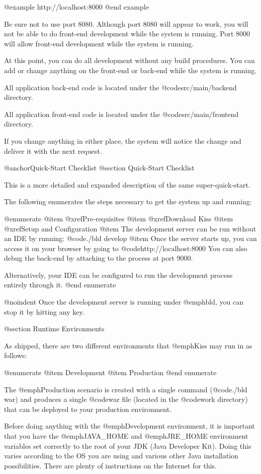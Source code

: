 @example
    http://localhost:8000
@end example

Be sure not to use port 8080.  Although port 8080 will appear to work,
you will not be able to do front-end development while the system is
running.  Port 8000 will allow front-end development while the system
is running.

At this point, you can do all development without any build
procedures.  You can add or change anything on the front-end or
back-end while the system is running.

All application back-end code is located under the @code{src/main/backend}
directory.

All application front-end code is located under the @code{src/main/frontend}
directory.

If you change anything in either place, the system will notice the change 
and deliver it with the next request.


@anchor{Quick-Start Checklist}
@section Quick-Start Checklist

This is a more detailed and expanded description of the same
super-quick-start.

The following enumerates the steps necessary to get the system up and running:

@enumerate
@item
@xref{Pre-requisites}
@item
@xref{Download Kiss}
@item
@xref{Setup and Configuration}
@item
The development server can be run without an IDE by running: @code{./bld develop}
@item
Once the server starts up, you can access it on your browser by going to 
@code{http://localhost:8000}  You can also debug the back-end by
attaching to the process at port 9000.

Alternatively, your IDE can be configured to run the development
process entirely through it.
@end enumerate

@noindent Once the development server is running under @emph{bld}, you can stop it 
by hitting any key.

@section Runtime Environments

As shipped, there are two different environments that @emph{Kiss} may
run in as follows:

@enumerate
@item
Development
@item 
Production
@end enumerate

The @emph{Production} scenario is created with a single command
(@code{./bld war}) and produces a single @code{war} file (located in
the @code{work} directory) that can be deployed to your production
environment.

Before doing anything with the @emph{Development} environment, it is
important that you have the @emph{JAVA_HOME} and @emph{JRE_HOME}
environment variables set correctly to the root of your JDK (Java
Developer Kit).  Doing this varies according to the OS you are using
and various other Java installation possibilities.  There are plenty
of instructions on the Internet for this.

